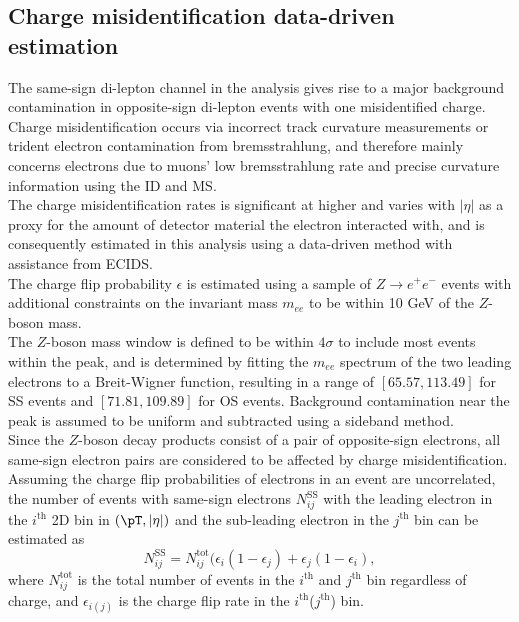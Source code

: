\documentclass[../thesis.tex]{subfiles}
\begin{document}
\subsection{Charge misidentification data-driven estimation}
\label{sec:qmisid}
The same-sign di-lepton channel in the analysis gives rise to a major background contamination in opposite-sign di-lepton events with one misidentified charge.\\
Charge misidentification occurs via incorrect track curvature measurements or trident electron contamination from bremsstrahlung, and therefore mainly concerns electrons due to muons' low bremsstrahlung rate and precise curvature information using the ID and MS.\\
The charge misidentification rates is significant at higher \pT and varies with $|\eta|$ as a proxy for the amount of detector material the electron interacted with, and is consequently estimated in this analysis using a data-driven method with assistance from ECIDS.\\
The charge flip probability $\epsilon$ is estimated using a sample of $Z\rightarrow e^{+}e^{-}$ events with additional constraints on the invariant mass $m_{ee}$ to be within 10 GeV of the $Z$-boson mass.\\
The $Z$-boson mass window is defined to be within $4\sigma$ to include most events within the peak, and is determined by fitting the $m_{ee}$ spectrum of the two leading electrons to a Breit-Wigner function, resulting in a range of $[65.57, 113.49]$ for SS events and $[71.81, 109.89]$ for OS events. Background contamination near the peak is assumed to be uniform and subtracted using a sideband method.\\
Since the $Z$-boson decay products consist of a pair of opposite-sign electrons, all same-sign electron pairs are considered to be affected by charge misidentification.\\
Assuming the charge flip probabilities of electrons in an event are uncorrelated, the number of events with same-sign electrons $N_{ij}^\mathrm{SS}$ with the leading electron in the $i^\mathrm{th}$ 2D bin in $(\pT,|\eta|)$ and the sub-leading electron in the $j^\mathrm{th}$ bin can be estimated as
\begin{equation}
N_{ij}^\mathrm{SS} = N_{ij}^\mathrm{tot} (\epsilon_i(1-\epsilon_j) + \epsilon_j(1-\epsilon_i),
\end{equation}
where $N_{ij}^\mathrm{tot}$ is the total number of events in the $i^\mathrm{th}$ and $j^\mathrm{th}$ bin regardless of charge, and $\epsilon_{i(j)}$ is the charge flip rate in the $i^\mathrm{th}$($j^\mathrm{th}$) bin.\\
\end{document}
